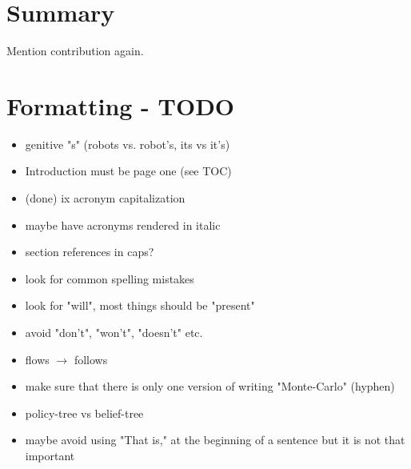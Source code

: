 \chapter{Summary}



Mention contribution again.

\chapter{Formatting - TODO}

\begin{itemize}
  \item genitive "s" (robots vs. robot's, its vs it's) 
  \item Introduction must be page one (see TOC)
  \item (done) ix acronym capitalization
  \item maybe have acronyms rendered in italic
  \item section references in caps?
  \item look for common spelling mistakes
  \item look for "will", most things should be "present"
  \item avoid "don't", "won't", "doesn't" etc.\
  \item flows $\to$ follows
  \item make sure that there is only one version of writing "Monte-Carlo" (hyphen)
  \item policy-tree vs belief-tree
  \item maybe avoid using "That is," at the beginning of a sentence but it is not that important
\end{itemize}
